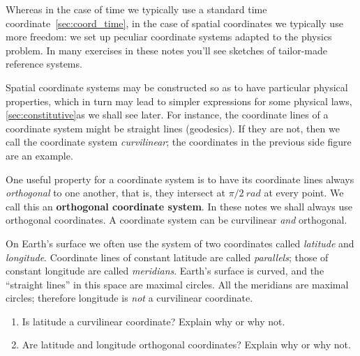 Whereas in the case of time we typically use a standard time coordinate~\autoref{sec:coord_time}, in the case of spatial coordinates we typically use more freedom: we set up peculiar coordinate systems adapted to the physics problem. In many exercises in these notes you'll see sketches of tailor-made reference systems.

\medskip

Spatial coordinate systems may be constructed so as to have particular physical properties, which in turn may lead to simpler expressions for some physical laws, \autoref{sec:constitutive}{as we shall see later}. For instance, the coordinate lines of a coordinate system might be straight lines (geodesics). If they are not, then we call the coordinate system \emph{curvilinear}; the coordinates in the previous side figure are an example.

One useful property for a coordinate system is to have its coordinate lines always \emph{orthogonal} to one another, that is, they intersect at $\pi/2\:\unit{rad}$ at every point. We call this an \textbf{orthogonal coordinate system}. In these notes we shall always use orthogonal coordinates. A coordinate system can be curvilinear \emph{and} orthogonal.

\begin{exercise}[label={ex:latlong}]
 On Earth's surface we often use the system of two coordinates called \emph{latitude} and \emph{longitude}. Coordinate lines of constant latitude are called \emph{parallels}; those of constant longitude are called \emph{meridians}. Earth's surface is curved, and the \enquote{straight lines} in this space are maximal circles. All the meridians are maximal circles; therefore longitude is \emph{not} a curvilinear coordinate.

 \begin{enumerate}[exerc]
 \item\label{item:latitude_curvilinear} Is latitude a curvilinear coordinate? Explain why or why not.

 \item\label{item:latlong_ortho} Are latitude and longitude orthogonal coordinates? Explain why or why not.
\end{enumerate}
\end{exercise}





